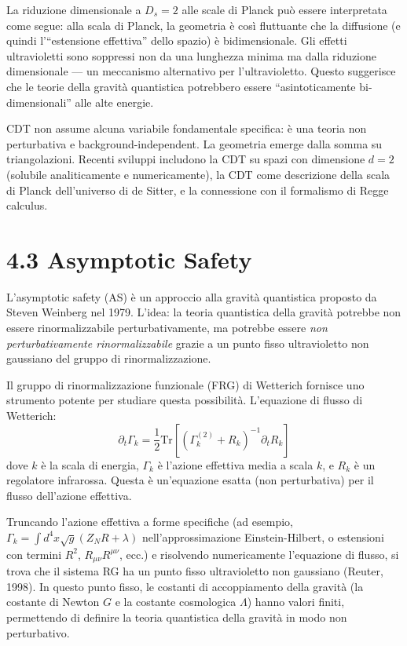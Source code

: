 \documentclass[11.5pt,a4paper,openany]{book}
\theoremstyle{remark}
\begin{document}
La riduzione dimensionale a $D_s = 2$ alle scale di Planck può essere interpretata come segue: alla scala di Planck, la geometria è così fluttuante che la diffusione (e quindi l'``estensione effettiva'' dello spazio) è bidimensionale. Gli effetti ultravioletti sono soppressi non da una lunghezza minima ma dalla riduzione dimensionale --- un meccanismo alternativo per l'ultravioletto. Questo suggerisce che le teorie della gravità quantistica potrebbero essere ``asintoticamente bi-dimensionali'' alle alte energie.

CDT non assume alcuna variabile fondamentale specifica: è una teoria non perturbativa e background-independent. La geometria emerge dalla somma su triangolazioni. Recenti sviluppi includono la CDT su spazi con dimensione $d=2$ (solubile analiticamente e numericamente), la CDT come descrizione della scala di Planck dell'universo di de Sitter, e la connessione con il formalismo di Regge calculus.

\section{4.3 Asymptotic Safety}

L'asymptotic safety (AS) è un approccio alla gravità quantistica proposto da Steven Weinberg nel 1979. L'idea: la teoria quantistica della gravità potrebbe non essere rinormalizzabile perturbativamente, ma potrebbe essere \textit{non perturbativamente rinormalizzabile} grazie a un punto fisso ultravioletto non gaussiano del gruppo di rinormalizzazione.

Il gruppo di rinormalizzazione funzionale (FRG) di Wetterich fornisce uno strumento potente per studiare questa possibilità. L'equazione di flusso di Wetterich:
\[
\partial_t \Gamma_k = \frac{1}{2} \text{Tr}\left[\left(\Gamma_k^{(2)} + R_k\right)^{-1} \partial_t R_k\right]
\]
dove $k$ è la scala di energia, $\Gamma_k$ è l'azione effettiva media a scala $k$, e $R_k$ è un regolatore infrarossa. Questa è un'equazione esatta (non perturbativa) per il flusso dell'azione effettiva.

Truncando l'azione effettiva a forme specifiche (ad esempio, $\Gamma_k = \int d^4x \sqrt{g}(Z_N R + \lambda)$ nell'approssimazione Einstein-Hilbert, o estensioni con termini $R^2$, $R_{\mu\nu}R^{\mu\nu}$, ecc.) e risolvendo numericamente l'equazione di flusso, si trova che il sistema RG ha un punto fisso ultravioletto non gaussiano (Reuter, 1998). In questo punto fisso, le costanti di accoppiamento della gravità (la costante di Newton $G$ e la costante cosmologica $\Lambda$) hanno valori finiti, permettendo di definire la teoria quantistica della gravità in modo non perturbativo.
\end{document}
